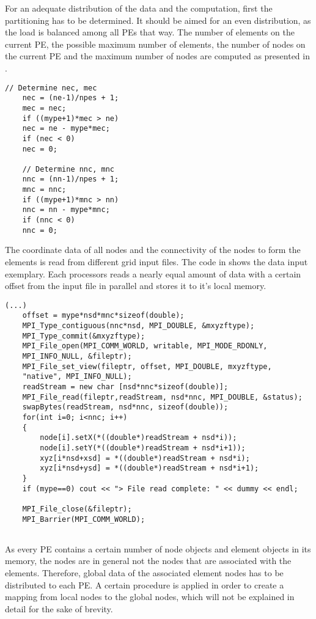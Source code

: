 For an adequate distribution of the data and the computation, first the partitioning has to be determined. It should be aimed for an even distribution, as the load is balanced among all PEs that way. The number of elements on the current PE, the possible maximum number of elements, the number of nodes on the current PE and the maximum number of nodes are computed as presented in .

\begin{lstlisting}[caption={\label{Code:MPI1} Determination of number elements on current rank and number nodes in current}]
	// Determine nec, mec
	nec = (ne-1)/npes + 1;
	mec = nec;
	if ((mype+1)*mec > ne)
	nec = ne - mype*mec;
	if (nec < 0)
	nec = 0;
	
	// Determine nnc, mnc
	nnc = (nn-1)/npes + 1;
	mnc = nnc;
	if ((mype+1)*mnc > nn)
	nnc = nn - mype*mnc;
	if (nnc < 0)
	nnc = 0;
\end{lstlisting}

The coordinate data of all nodes and the connectivity of the nodes to form the elements is read from different grid input files. The code in  shows the data input exemplary. Each processors reads a nearly equal amount of data with a certain offset from the input file in parallel and stores it to it's local memory. 

\begin{lstlisting}[caption={\label{Code:MPI2} Read file for every rank with specific offset}]
	(...)
	offset = mype*nsd*mnc*sizeof(double);
	MPI_Type_contiguous(nnc*nsd, MPI_DOUBLE, &mxyzftype);
	MPI_Type_commit(&mxyzftype);
	MPI_File_open(MPI_COMM_WORLD, writable, MPI_MODE_RDONLY, 
	MPI_INFO_NULL, &fileptr);
	MPI_File_set_view(fileptr, offset, MPI_DOUBLE, mxyzftype, 
	"native", MPI_INFO_NULL);
	readStream = new char [nsd*nnc*sizeof(double)];
	MPI_File_read(fileptr,readStream, nsd*nnc, MPI_DOUBLE, &status);
	swapBytes(readStream, nsd*nnc, sizeof(double));
	for(int i=0; i<nnc; i++)
	{
		node[i].setX(*((double*)readStream + nsd*i));
		node[i].setY(*((double*)readStream + nsd*i+1));
		xyz[i*nsd+xsd] = *((double*)readStream + nsd*i);
		xyz[i*nsd+ysd] = *((double*)readStream + nsd*i+1);
	}
	if (mype==0) cout << "> File read complete: " << dummy << endl;
	
	MPI_File_close(&fileptr);
	MPI_Barrier(MPI_COMM_WORLD);
	
\end{lstlisting}

As every PE contains a certain number of node objects and element objects in its memory, the nodes are in general not the nodes that are associated with the elements. Therefore, global data of the associated element nodes has to be distributed to each PE. A certain procedure is applied in order to create a mapping from local nodes to the global nodes, which will not be explained in detail for the sake of brevity.

